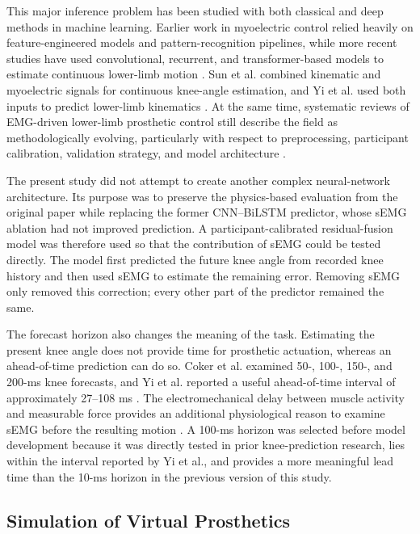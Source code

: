 \documentclass[referee,lineno,pdflatex,sn-vancouver-num]{sn-jnl}
\begin{document}
This major inference problem has been studied with both classical and deep methods in machine learning. Earlier work in myoelectric control relied heavily on feature-engineered models and pattern-recognition pipelines, while more recent studies have used convolutional, recurrent, and transformer-based models to estimate continuous lower-limb motion \cite{hargrove2007,sun2022,yi2022}. Sun et al. combined kinematic and myoelectric signals for continuous knee-angle estimation, and Yi et al. used both inputs to predict lower-limb kinematics \cite{sun2022,yi2022}. At the same time, systematic reviews of EMG-driven lower-limb prosthetic control still describe the field as methodologically evolving, particularly with respect to preprocessing, participant calibration, validation strategy, and model architecture \cite{cimolato2022,ahkami2023}.

The present study did not attempt to create another complex neural-network architecture. Its purpose was to preserve the physics-based evaluation from the original paper while replacing the former CNN--BiLSTM predictor, whose sEMG ablation had not improved prediction. A participant-calibrated residual-fusion model was therefore used so that the contribution of sEMG could be tested directly. The model first predicted the future knee angle from recorded knee history and then used sEMG to estimate the remaining error. Removing sEMG only removed this correction; every other part of the predictor remained the same.

The forecast horizon also changes the meaning of the task. Estimating the present knee angle does not provide time for prosthetic actuation, whereas an ahead-of-time prediction can do so. Coker et al. examined 50-, 100-, 150-, and 200-ms knee forecasts, and Yi et al. reported a useful ahead-of-time interval of approximately 27--108 ms \cite{coker2021,yi2022}. The electromechanical delay between muscle activity and measurable force provides an additional physiological reason to examine sEMG before the resulting motion \cite{cavanagh1979}. A 100-ms horizon was selected before model development because it was directly tested in prior knee-prediction research, lies within the interval reported by Yi et al., and provides a more meaningful lead time than the 10-ms horizon in the previous version of this study.

\subsection{Simulation of Virtual Prosthetics}
\end{document}
